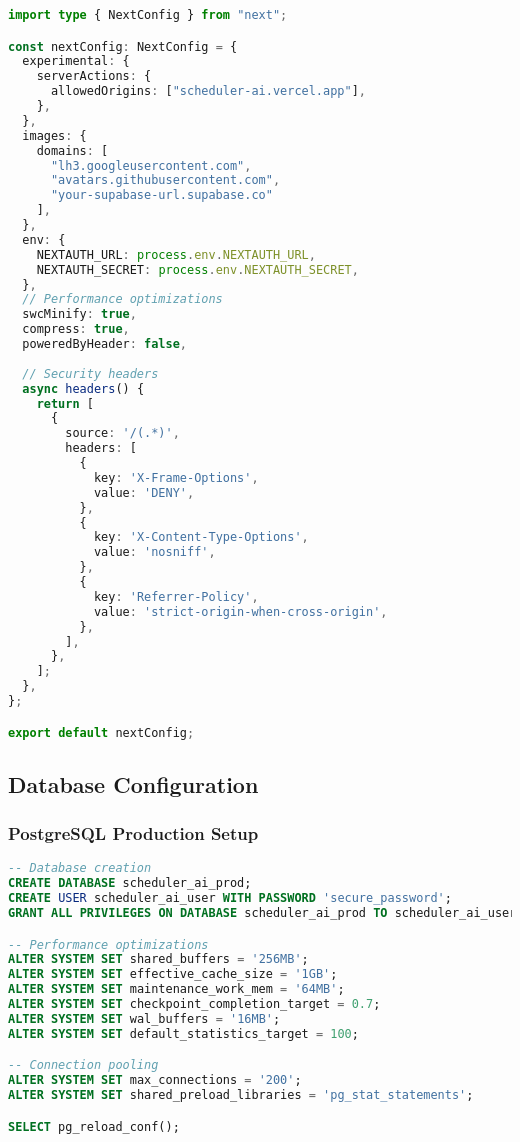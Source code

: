\begin{lstlisting}[language=TypeScript, caption=next.config.ts - Production Config]
import type { NextConfig } from "next";

const nextConfig: NextConfig = {
  experimental: {
    serverActions: {
      allowedOrigins: ["scheduler-ai.vercel.app"],
    },
  },
  images: {
    domains: [
      "lh3.googleusercontent.com", 
      "avatars.githubusercontent.com",
      "your-supabase-url.supabase.co"
    ],
  },
  env: {
    NEXTAUTH_URL: process.env.NEXTAUTH_URL,
    NEXTAUTH_SECRET: process.env.NEXTAUTH_SECRET,
  },
  // Performance optimizations
  swcMinify: true,
  compress: true,
  poweredByHeader: false,
  
  // Security headers
  async headers() {
    return [
      {
        source: '/(.*)',
        headers: [
          {
            key: 'X-Frame-Options',
            value: 'DENY',
          },
          {
            key: 'X-Content-Type-Options',
            value: 'nosniff',
          },
          {
            key: 'Referrer-Policy',
            value: 'strict-origin-when-cross-origin',
          },
        ],
      },
    ];
  },
};

export default nextConfig;
\end{lstlisting}

\subsection{Database Configuration}

\subsubsection{PostgreSQL Production Setup}

\begin{lstlisting}[language=SQL, caption=Database Production Configuration]
-- Database creation
CREATE DATABASE scheduler_ai_prod;
CREATE USER scheduler_ai_user WITH PASSWORD 'secure_password';
GRANT ALL PRIVILEGES ON DATABASE scheduler_ai_prod TO scheduler_ai_user;

-- Performance optimizations
ALTER SYSTEM SET shared_buffers = '256MB';
ALTER SYSTEM SET effective_cache_size = '1GB';
ALTER SYSTEM SET maintenance_work_mem = '64MB';
ALTER SYSTEM SET checkpoint_completion_target = 0.7;
ALTER SYSTEM SET wal_buffers = '16MB';
ALTER SYSTEM SET default_statistics_target = 100;

-- Connection pooling
ALTER SYSTEM SET max_connections = '200';
ALTER SYSTEM SET shared_preload_libraries = 'pg_stat_statements';

SELECT pg_reload_conf();
\end{lstlisting}

